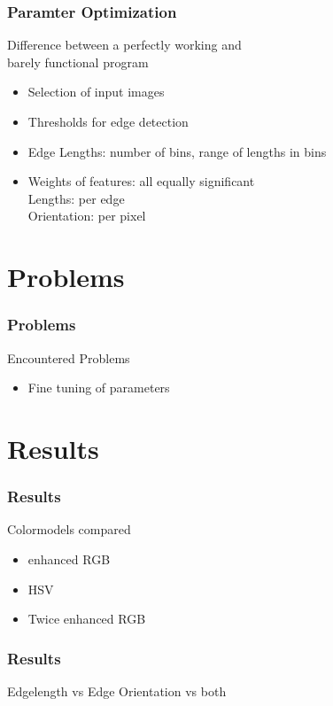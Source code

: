\documentclass{beamer}
\begin{document}
\begin{frame}
	\frametitle{Paramter Optimization}
	\begin{block}{}
	Difference between a perfectly working and \\barely functional program 
	\end{block}
	\begin{itemize}
		\item Selection of input images
		\item Thresholds for edge detection
		\item Edge Lengths: number of bins, range of lengths in bins
		\item Weights of features:  all equally significant
		\\Lengths: per edge
		\\Orientation: per pixel
		
	\end{itemize}
	
\end{frame}

\section{Problems}
\begin{frame}
	\frametitle{Problems}
    \begin{block}{Encountered Problems}
	    \begin{itemize}
		    \item Fine tuning of parameters
	    \end{itemize}
    \end{block}
\end{frame}

\section{Results}
\begin{frame}
	\frametitle{Results}
    \begin{block}{Colormodels compared}
    	\begin{itemize}
    		\item enhanced RGB
    		\item HSV
    		\item Twice enhanced RGB
    	\end{itemize}
    \end{block}
\end{frame}

\begin{frame}
	\frametitle{Results}
    \begin{block}{Edgelength vs Edge Orientation vs both}
    \end{block}
\end{frame}
\end{document}

